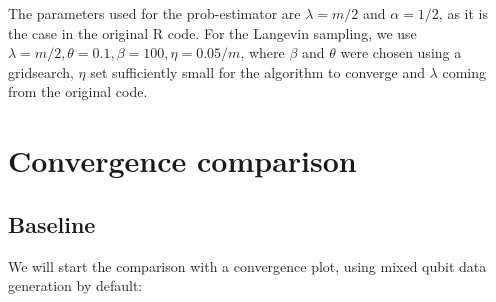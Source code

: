 \documentclass[12pt]{memoir}
\begin{document}
The parameters used for the prob-estimator are $\lambda=m/2$ and $\alpha=1/2$, as it is the case in the original R code. For the Langevin sampling, we use $\lambda=m/2,\theta=0.1,\beta=100,\eta=0.05/m$, where $\beta$ and $\theta$ were chosen using a gridsearch, $\eta$ set sufficiently small for the algorithm to converge and $\lambda$ coming from the original code.

\section{Convergence comparison}\label{section:convergence-comparison}

\subsection*{Baseline}

We will start the comparison with a convergence plot, using mixed qubit data generation by default:
\end{document}
